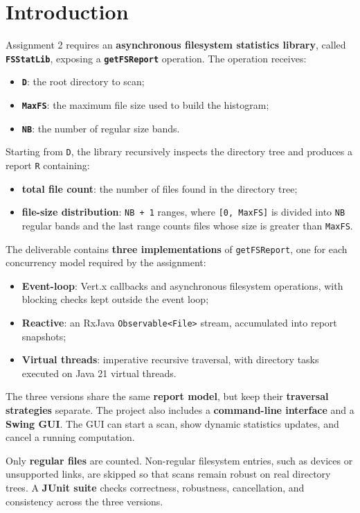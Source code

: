 \section{Introduction}

Assignment 2 requires an \textbf{asynchronous filesystem statistics library}, called \textbf{\texttt{FSStatLib}}, exposing a \textbf{\texttt{getFSReport}} operation.
The operation receives:

\begin{itemize}
  \item \textbf{\texttt{D}}: the root directory to scan;
  \item \textbf{\texttt{MaxFS}}: the maximum file size used to build the histogram;
  \item \textbf{\texttt{NB}}: the number of regular size bands.
\end{itemize}

Starting from \texttt{D}, the library recursively inspects the directory tree and produces a report \texttt{R} containing:

\begin{itemize}
  \item \textbf{total file count}: the number of files found in the directory tree;
  \item \textbf{file-size distribution}: \texttt{NB + 1} ranges, where \texttt{[0, MaxFS]} is divided into \texttt{NB} regular bands and the last range counts files whose size is greater than \texttt{MaxFS}.
\end{itemize}

The deliverable contains \textbf{three implementations} of \texttt{getFSReport}, one for each concurrency model required by the assignment:

\begin{itemize}
  \item \textbf{Event-loop}: Vert.x callbacks and asynchronous filesystem operations, with blocking checks kept outside the event loop;
  \item \textbf{Reactive}: an RxJava \texttt{Observable<File>} stream, accumulated into report snapshots;
  \item \textbf{Virtual threads}: imperative recursive traversal, with directory tasks executed on Java 21 virtual threads.
\end{itemize}

The three versions share the same \textbf{report model}, but keep their \textbf{traversal strategies} separate. 
The project also includes a \textbf{command-line interface} and a \textbf{Swing GUI}.
The GUI can start a scan, show dynamic statistics updates, and cancel a running computation.

Only \textbf{regular files} are counted.
Non-regular filesystem entries, such as devices or unsupported links, are skipped so that scans remain robust on
real directory trees.
A \textbf{JUnit suite} checks correctness, robustness, cancellation, and consistency across the three versions.

